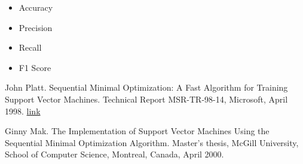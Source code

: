 \documentclass[10pt,a4paper]{article}
\begin{document}
\begin{itemize}
	\item Accuracy
	\item Precision
	\item Recall
	\item F1 Score
\end{itemize}

 
\begin{thebibliography}{1}
	
	John Platt.
	\newblock Sequential Minimal Optimization: A Fast Algorithm for Training Support Vector Machines.
	\newblock Technical Report MSR-TR-98-14, Microsoft, April 1998.
	\newblock \href{https://www.microsoft.com/en-us/research/publication/sequential-minimal-optimization-a-fast-algorithm-for-training-support-vector-machines/}{link}
	
	Ginny Mak.
	\newblock The Implementation of Support Vector Machines Using the Sequential Minimal Optimization Algorithm.
	\newblock Master's thesis, McGill University, School of Computer Science, Montreal, Canada, April 2000.
	
\end{thebibliography}
\end{document}
